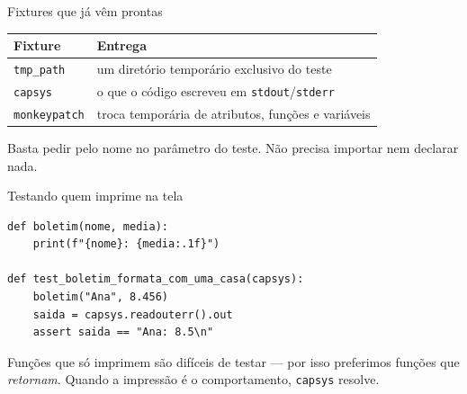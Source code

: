 \documentclass[aspectratio=169]{beamer}
\begin{document}
\begin{frame}{Fixtures que já vêm prontas}
  \begin{center}
  \small
  \begin{tabular}{ll}
    \toprule
    \textbf{Fixture} & \textbf{Entrega} \\
    \midrule
    \texttt{tmp\_path}    & um diretório temporário exclusivo do teste \\
    \texttt{capsys}       & o que o código escreveu em \texttt{stdout}/\texttt{stderr} \\
    \texttt{monkeypatch}  & troca temporária de atributos, funções e variáveis \\
    \bottomrule
  \end{tabular}
  \end{center}
  \vspace{0.6em}
  \small Basta pedir pelo nome no parâmetro do teste. Não precisa
  importar nem declarar nada.
\end{frame}

\begin{frame}[fragile]{Testando quem imprime na tela}
\begin{lstlisting}
def boletim(nome, media):
    print(f"{nome}: {media:.1f}")

def test_boletim_formata_com_uma_casa(capsys):
    boletim("Ana", 8.456)
    saida = capsys.readouterr().out
    assert saida == "Ana: 8.5\n"
\end{lstlisting}
  \small Funções que só imprimem são difíceis de testar --- por isso
  preferimos funções que \emph{retornam}. Quando a impressão é o
  comportamento, \texttt{capsys} resolve.
\end{frame}
\end{document}
